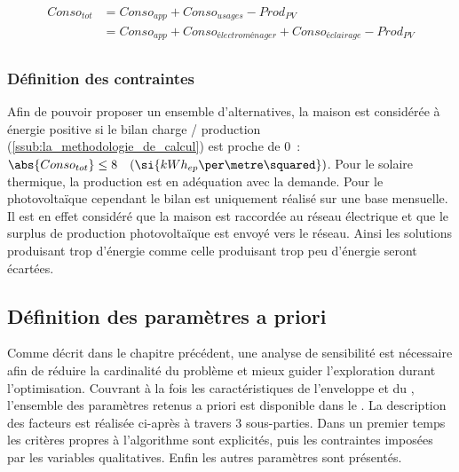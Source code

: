 \begin{align} \label{eq:conso_totale}
  Conso_{tot} &= Conso_{app} + Conso_{usages} - Prod_{PV}  \\
              &= Conso_{app} + Conso_{électroménager} + Conso_{éclairage} - Prod_{PV} \\
\end{align}


\subsubsection{Définition des contraintes} %
\label{ssub:definition_des_contraintes}
Afin de pouvoir proposer un ensemble d’alternatives, la maison est considérée
à énergie positive si le bilan charge / production (\ref{ssub:la_methodologie_de_calcul})
est proche de $0$~: $\abs{Conso_{tot}}   \leq  8 \quad (\si{kWh_{ep}\per\metre\squared})$.
Pour le solaire thermique, la production est en adéquation avec la demande. Pour le
photovoltaïque cependant le bilan est uniquement réalisé sur une base mensuelle. Il
est en effet considéré que la maison est raccordée au réseau électrique et que le surplus
de production photovoltaïque est envoyé vers le réseau.
Ainsi les solutions produisant trop d’énergie comme celle produisant trop peu d’énergie
seront écartées.



\subsection{Définition des paramètres a priori} %
\label{sub:definition_des_parametres_a_priori}
Comme décrit dans le chapitre précédent, une analyse de sensibilité est nécessaire
afin de réduire la cardinalité du problème et mieux guider l’exploration durant l’optimisation.
Couvrant à la fois les caractéristiques de l’enveloppe et du , l’ensemble des
paramètres retenus a priori est disponible dans le .
La description des facteurs est réalisée ci-après à travers $3$ sous-parties. Dans un premier
temps les critères propres à l’algorithme sont explicités, puis les contraintes imposées
par les variables qualitatives. Enfin les autres paramètres sont présentés.

